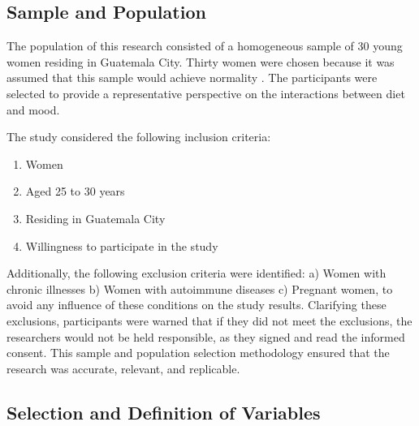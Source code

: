 \documentclass[jou]{apa7}
\begin{document}

\subsection{Sample and Population}\label{muestra-y-poblaciuxf3n}

The population of this research consisted of a homogeneous sample of 30 young women residing in Guatemala City. Thirty women were chosen because it was assumed that this sample would achieve normality \parencite{Hernandez2018}. The participants were selected to provide a representative perspective on the interactions between diet and mood.


The study considered the following inclusion criteria:
\begin{enumerate}
	\item Women
	\item Aged 25 to 30 years
	\item Residing in Guatemala City
	\item Willingness to participate in the study
\end{enumerate}

Additionally, the following exclusion criteria were identified: a) Women with chronic illnesses b) Women with autoimmune diseases c) Pregnant women, to avoid any influence of these conditions on the study results. Clarifying these exclusions, participants were warned that if they did not meet the exclusions, the researchers would not be held responsible, as they signed and read the informed consent. This sample and population selection methodology ensured that the research was accurate, relevant, and replicable.

\subsection{Selection and Definition of Variables}\label{selecciuxf3n-y-definiciuxf3n-de-variables}
\end{document}
